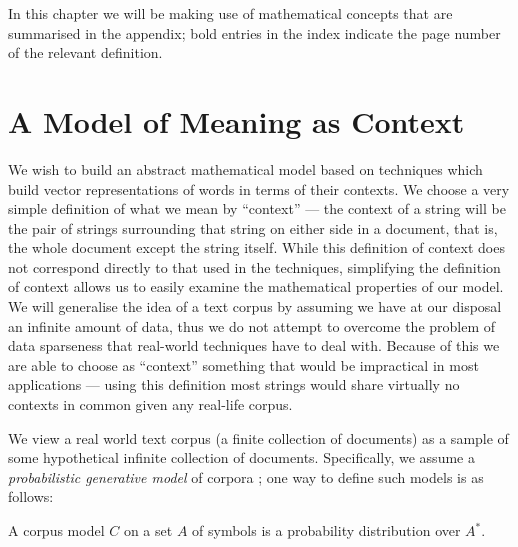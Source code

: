 In this chapter we will be making use of mathematical concepts that are summarised in the appendix; bold entries in the index indicate the page number of the relevant definition.

\section{A Model of Meaning as Context}
\label{model-meaning-context}

We wish to build an abstract mathematical model based on techniques which build vector representations of words in terms of their contexts.
We choose a very simple definition of what we mean by ``context'' --- the context of a string will be the pair of strings surrounding that string on either side in a document, that is, the whole document except the string itself. While this definition of context does not correspond directly to that used in the techniques, simplifying the definition of context allows us to easily examine the mathematical properties of our model. We will generalise the idea of a text corpus by assuming we have at our disposal an infinite amount of data, thus we do not attempt to overcome the problem of data sparseness that real-world techniques have to deal with. Because of this we are able to choose as ``context'' something that would be impractical in most applications --- using this definition most strings would share virtually no contexts in common given any real-life corpus.

We view a real world text corpus (a finite collection of documents) as a sample of some hypothetical infinite collection of documents. 
 Specifically, we assume a \emph{probabilistic generative model} of corpora \citep{Blei:03}; one way to define such models is as follows:
\begin{defn}[Corpus Model]
A corpus model $C$ on a set $A$ of symbols is a probability distribution over $A^*$.
\end{defn} %

